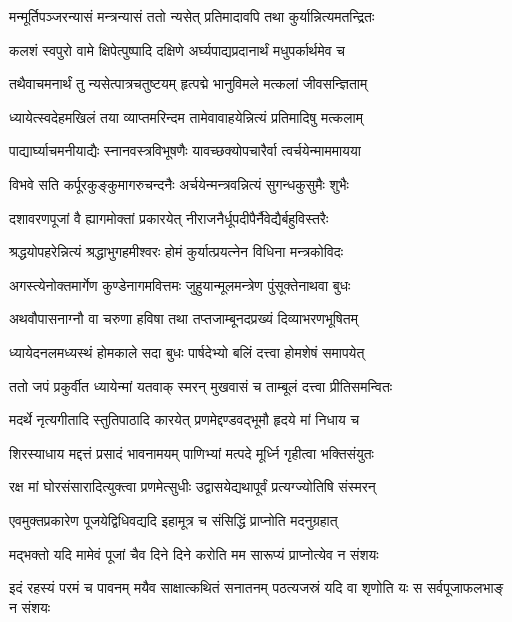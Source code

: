 \twolineshloka
{मन्मूर्तिपञ्जरन्यासं मन्त्रन्यासं ततो न्यसेत्}
{प्रतिमादावपि तथा कुर्यान्नित्यमतन्द्रितः} %

\twolineshloka
{कलशं स्वपुरो वामे क्षिपेत्पुष्पादि दक्षिणे}
{अर्घ्यपाद्यप्रदानार्थं मधुपर्कार्थमेव च} %

\twolineshloka
{तथैवाचमनार्थं तु न्यसेत्पात्रचतुष्टयम्}
{हृत्पद्मे भानुविमले मत्कलां जीवसन्ज्ञिताम्} %

\twolineshloka
{ध्यायेत्स्वदेहमखिलं तया व्याप्तमरिन्दम}
{तामेवावाहयेन्नित्यं प्रतिमादिषु मत्कलाम्} %

\twolineshloka
{पाद्यार्घ्याचमनीयाद्यैः स्नानवस्त्रविभूषणैः}
{यावच्छक्योपचारैर्वा त्वर्चयेन्माममायया} %

\twolineshloka
{विभवे सति कर्पूरकुङ्कुमागरुचन्दनैः}
{अर्चयेन्मन्त्रवन्नित्यं सुगन्धकुसुमैः शुभैः} %

\twolineshloka
{दशावरणपूजां वै ह्यागमोक्तां प्रकारयेत्}
{नीराजनैर्धूपदीपैर्नैवेद्यैर्बहुविस्तरैः} %

\twolineshloka
{श्रद्धयोपहरेन्नित्यं श्रद्धाभुगहमीश्वरः}
{होमं कुर्यात्प्रयत्नेन विधिना मन्त्रकोविदः} %

\twolineshloka
{अगस्त्येनोक्तमार्गेण कुण्डेनागमवित्तमः}
{जुहुयान्मूलमन्त्रेण पुंसूक्तेनाथवा बुधः} %

\twolineshloka
{अथवौपासनाग्नौ वा चरुणा हविषा तथा}
{तप्तजाम्बूनदप्रख्यं दिव्याभरणभूषितम्} %

\twolineshloka
{ध्यायेदनलमध्यस्थं होमकाले सदा बुधः}
{पार्षदेभ्यो बलिं दत्त्वा होमशेषं समापयेत्} %

\twolineshloka
{ततो जपं प्रकुर्वीत ध्यायेन्मां यतवाक् स्मरन्}
{मुखवासं च ताम्बूलं दत्त्वा प्रीतिसमन्वितः} %

\twolineshloka
{मदर्थे नृत्यगीतादि स्तुतिपाठादि कारयेत्}
{प्रणमेद्दण्डवद्भूमौ हृदये मां निधाय च} %

\twolineshloka
{शिरस्याधाय मद्दत्तं प्रसादं भावनामयम्}
{पाणिभ्यां मत्पदे मूर्ध्नि गृहीत्वा भक्तिसंयुतः} %

\twolineshloka
{रक्ष मां घोरसंसारादित्युक्त्वा प्रणमेत्सुधीः}
{उद्वासयेद्यथापूर्वं प्रत्यग्ज्योतिषि संस्मरन्} %

\twolineshloka
{एवमुक्तप्रकारेण पूजयेद्विधिवद्यदि}
{इहामूत्र च संसिद्धिं प्राप्नोति मदनुग्रहात्} %

\twolineshloka
{मद्भक्तो यदि मामेवं पूजां चैव दिने दिने}
{करोति मम सारूप्यं प्राप्नोत्येव न संशयः} %

\fourlineindentedshloka
{इदं रहस्यं परमं च पावनम्}
{मयैव साक्षात्कथितं सनातनम्}
{पठत्यजस्रं यदि वा शृणोति यः}
{स सर्वपूजाफलभाङ् न संशयः} %

